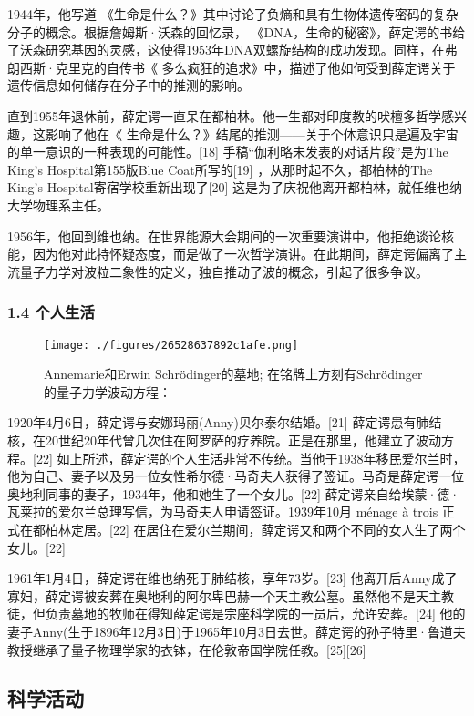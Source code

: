 1944年，他写道 《生命是什么？》其中讨论了负熵和具有生物体遗传密码的复杂分子的概念。根据詹姆斯·沃森的回忆录， 《DNA，生命的秘密》，薛定谔的书给了沃森研究基因的灵感，这使得1953年DNA双螺旋结构的成功发现。同样，在弗朗西斯·克里克的自传书《 多么疯狂的追求》中，描述了他如何受到薛定谔关于遗传信息如何储存在分子中的推测的影响。

直到1955年退休前，薛定谔一直呆在都柏林。他一生都对印度教的吠檀多哲学感兴趣，这影响了他在《 生命是什么？》结尾的推测——关于个体意识只是遍及宇宙的单一意识的一种表现的可能性。[18] 手稿“伽利略未发表的对话片段”是为The King's Hospital第155版Blue Coat所写的[19] ，从那时起不久，都柏林的The King's Hospital寄宿学校重新出现了[20] 这是为了庆祝他离开都柏林，就任维也纳大学物理系主任。

1956年，他回到维也纳。在世界能源大会期间的一次重要演讲中，他拒绝谈论核能，因为他对此持怀疑态度，而是做了一次哲学演讲。在此期间，薛定谔偏离了主流量子力学对波粒二象性的定义，独自推动了波的概念，引起了很多争议。

\subsubsection{1.4 个人生活}
\begin{figure}[ht]
\centering
\texttt{[image: ./figures/26528637892c1afe.png]}
\caption{Annemarie和Erwin Schrödinger的墓地; 在铭牌上方刻有Schrödinger的量子力学波动方程：} \label{fig_Erwin_3}
\end{figure}
1920年4月6日，薛定谔与安娜玛丽(Anny)贝尔泰尔结婚。[21] 薛定谔患有肺结核，在20世纪20年代曾几次住在阿罗萨的疗养院。正是在那里，他建立了波动方程。[22] 如上所述，薛定谔的个人生活非常不传统。当他于1938年移民爱尔兰时，他为自己、妻子以及另一位女性希尔德·马奇夫人获得了签证。马奇是薛定谔一位奥地利同事的妻子，1934年，他和她生了一个女儿。[22] 薛定谔亲自给埃蒙·德·瓦莱拉的爱尔兰总理写信，为马奇夫人申请签证。1939年10月 ménage à trois 正式在都柏林定居。[22] 在居住在爱尔兰期间，薛定谔又和两个不同的女人生了两个女儿。[22]

1961年1月4日，薛定谔在维也纳死于肺结核，享年73岁。[23] 他离开后Anny成了寡妇，薛定谔被安葬在奥地利的阿尔卑巴赫一个天主教公墓。虽然他不是天主教徒，但负责墓地的牧师在得知薛定谔是宗座科学院的一员后，允许安葬。[24] 他的妻子Anny(生于1896年12月3日)于1965年10月3日去世。薛定谔的孙子特里·鲁道夫教授继承了量子物理学家的衣钵，在伦敦帝国学院任教。[25][26]

\subsection{科学活动}
